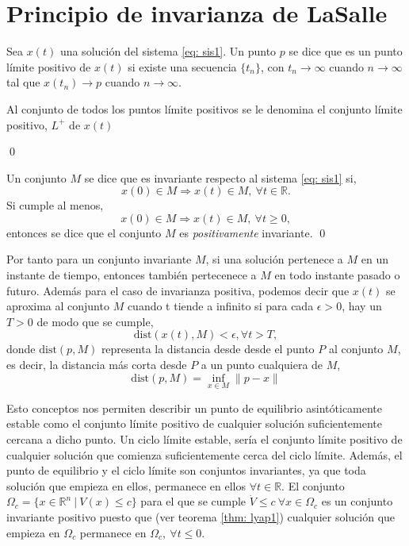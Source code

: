 \section{Principio de invarianza de LaSalle}

\begin{definition}
Sea $x(t)$ una solución del sistema \ref{eq: sis1}. Un punto $p$ se dice que es un punto límite positivo de $x(t)$ si existe una secuencia $\{t_n\}$, con $t_n\to \infty$ cuando $n\to \infty$ tal que $x(t_n) \to p$ cuando $n \to \infty$.

Al conjunto de todos los puntos límite positivos se le denomina el conjunto límite positivo, $L^+$ de $x(t)$

\qed
\end{definition}

\begin{definition}
Un conjunto $M$ se dice que es invariante respecto al sistema \ref{eq: sis1}  si,
\begin{equation*}
x(0) 	\in M \Rightarrow x(t) \in M,\ \forall t \in \mathbb{R}.
\end{equation*}
Si cumple al menos,
\begin{equation*}
x(0) 	\in M \Rightarrow x(t) \in M,\ \forall t \geq 0,
\end{equation*}
entonces se dice que el conjunto $M$ es \emph{positivamente} invariante.
\qed
\end{definition}

Por tanto para un conjunto invariante $M$, si una solución pertenece a $M$ en un instante de tiempo, entonces también pertecenece a $M$ en todo instante pasado o futuro. Además para el caso de invarianza positiva, podemos decir que $x(t)$ se aproxima al conjunto $M$ cuando t tiende a infinito si para cada $\epsilon >0$,  hay un $T>0$ de modo que se cumple,
\begin{equation*}
\text{dist}(x(t),M)<\epsilon, \forall t>T,
\end{equation*} 
donde $\text{dist}(p,M)$ representa la distancia desde desde el punto $P$ al conjunto $M$, es decir, la distancia más corta desde $P$ a un punto cualquiera de $M$,
\begin{equation}
\text{dist}(p,M) = \inf_{x\in M}\|p-x\|
\end{equation} 

Esto conceptos nos permiten describir un punto de equilibrio asintóticamente estable como el conjunto límite positivo de cualquier solución suficientemente cercana a dicho punto. Un ciclo límite estable, sería el conjunto límite positivo de cualquier solución que comienza suficientemente cerca del ciclo límite. Además, el punto de equilibrio y el ciclo límite son conjuntos invariantes, ya que toda solución que empieza en ellos, permanece en ellos $\forall t \in \mathbb{R}$. El conjunto $\Omega_c =\{x \in \mathbb{R}^n\ |\ V(x)\leq c\}$ para el que se cumple $\dot V \leq c\ \forall x \in \Omega_c$ es un conjunto invariante positivo puesto que (ver teorema \ref{thm: lyap1}) cualquier solución que empieza en $\Omega_c$ permanece en $\Omega_c, \ \forall t \leq 0$.

